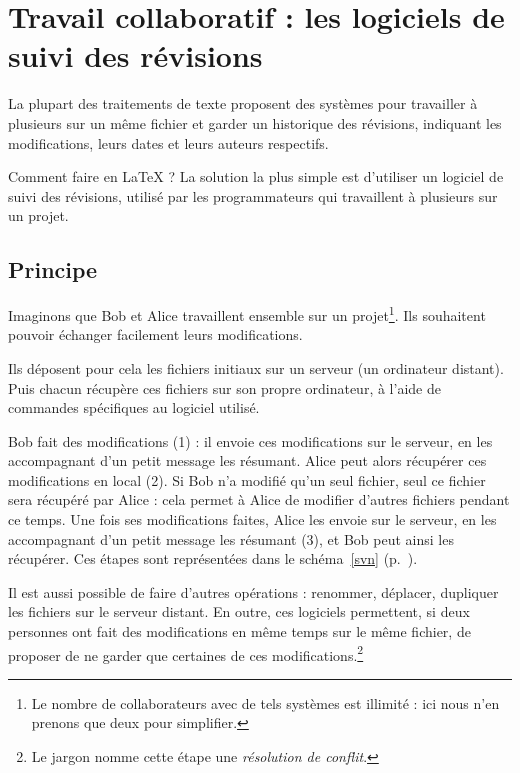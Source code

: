 \chapter{Travail collaboratif : les logiciels de suivi des révisions}\label{principesvn}    %

\begin{intro}
    La plupart des traitements de texte proposent des systèmes pour travailler à plusieurs sur un même fichier et garder un historique des révisions, indiquant les modifications, leurs dates et leurs auteurs respectifs. 
    
    Comment faire en \LaTeX{} ? La solution la plus simple est d'utiliser un logiciel de suivi des révisions, utilisé par les programmateurs qui travaillent à plusieurs sur un projet.
\end{intro}

\section{Principe}
Imaginons que Bob et Alice travaillent ensemble sur un projet\footnote{Le nombre de collaborateurs avec de tels systèmes est illimité : ici nous n'en prenons que deux pour simplifier.}. Ils souhaitent pouvoir échanger facilement leurs modifications.

Ils déposent  pour cela  les fichiers initiaux sur un serveur (un ordinateur distant). Puis chacun récupère ces fichiers sur son propre ordinateur, à l'aide de commandes spécifiques au logiciel utilisé.

Bob fait des modifications (1) : il envoie ces modifications sur le serveur, en les accompagnant d'un petit message les résumant. Alice peut alors récupérer ces modifications en local (2). Si Bob n'a modifié qu'un seul fichier, seul ce fichier sera récupéré par Alice : cela permet à Alice de modifier d'autres fichiers pendant ce temps. Une fois ses modifications faites, Alice les envoie sur le serveur, en les accompagnant d'un petit message les résumant (3), et Bob peut ainsi les récupérer. Ces étapes sont représentées dans le schéma~\ref{svn} (p.~\pageref{svn}). 

Il est aussi possible de faire d'autres opérations : renommer, déplacer, dupliquer les fichiers sur le serveur distant. En outre, ces logiciels permettent, si deux personnes ont fait des modifications en même temps sur le même fichier, de proposer de ne garder que certaines de ces modifications.\footnote{Le jargon nomme cette étape une \emph{résolution de conflit}.}

